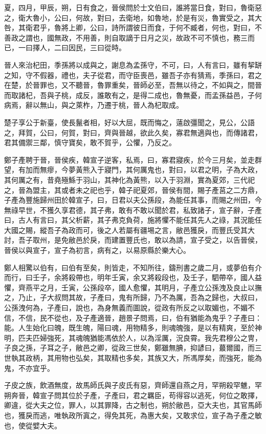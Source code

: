 \begin{pinyinscope}
夏，四月，甲辰，朔，日有食之，晉侯問於士文伯曰，誰將當日食，對曰，魯衛惡之，衛大魯小，公曰，何故，對曰，去衛地，如魯地，於是有災，魯實受之，其大咎，其衛君乎，魯將上卿，公曰，詩所謂彼日而食，于何不臧者，何也，對曰，不善政之謂也，國無政，不用善，則自取謫于日月之災，故政不可不慎也，務三而已，一曰擇人，二曰因民，三曰從時。

晉人來治杞田，季孫將以成與之，謝息為孟孫守，不可，曰，人有言曰，雖有挈缾之知，守不假器，禮也，夫子從君，而守臣喪邑，雖吾子亦有猜焉，季孫曰，君之在楚，於晉罪也，又不聽晉，魯罪重矣，晉師必至，吾無以待之，不如與之，間晉而取諸杞，吾與子桃，成反，誰敢有之，是得二成也，魯無憂，而孟孫益邑，子何病焉，辭以無山，與之萊柞，乃遷于桃，晉人為杞取成。

楚子享公于新臺，使長鬣者相，好以大屈，既而悔之，薳啟彊聞之，見公，公語之，拜賀，公曰，何賀，對曰，齊與晉越，欲此久矣，寡君無適與也，而傳諸君，君其備禦三鄰，慎守寶矣，敢不賀乎，公懼，乃反之。

鄭子產聘于晉，晉侯疾，韓宣子逆客，私焉，曰，寡君寢疾，於今三月矣，並走群望，有加而無瘳，今夢黃熊入于寢門，其何厲鬼也，對曰，以君之明，子為大政，其何厲之有，昔堯殛鯀于羽山，其神化為黃熊，以入于羽淵，實為夏郊，三代祀之，晉為盟主，其或者未之祀也乎，韓子祀夏郊，晉侯有間，賜子產莒之二方鼎，子產為豐施歸州田於韓宣子，曰，日君以夫公孫段，為能任其事，而賜之州田，今無祿早世，不獲久享君德，其子弗，敢有不敢以聞於君，私致諸子，宣子辭，子產曰，古人有言曰，其父析薪，其子弗克負荷，施將懼不能任其先人之祿，其況能任大國之賜，縱吾子為政而可，後之人若屬有疆埸之言，敝邑獲戾，而豐氏受其大討，吾子取州，是免敝邑於戾，而建置豐氏也，敢以為請，宣子受之，以告晉侯，晉侯以與宣子，宣子為初言，病有之，以易原縣於樂大心。

鄭人相驚以伯有，曰伯有至矣，則皆走，不知所往，鑄刑書之歲二月，或夢伯有介而行，曰壬子，余將殺帶也，明年壬寅，余又將殺段也，及壬子，駟帶卒，國人益懼，齊燕平之月，壬寅，公孫段卒，國人愈懼，其明月，子產立公孫洩及良止以撫之，乃止，子大叔問其故，子產曰，鬼有所歸，乃不為厲，吾為之歸也，大叔曰，公孫洩何為，子產曰，說也，為身無義而圖說，從政有所反之以取媚也，不媚不信，不信，民不從也，及子產適晉，趙景子問焉，曰，伯有猶能為鬼乎？子產曰：能。人生始化曰魄，既生魄，陽曰魂，用物精多，則魂魄強，是以有精爽，至於神明，匹夫匹婦強死，其魂魄猶能馮依於人，以為淫厲，況良霄。我先君穆公之冑，子良之孫，子耳之子，敝邑之卿，從政三世矣，鄭雖無腆，抑諺曰，蕞爾國，而三世執其政柄，其用物也弘矣，其取精也多矣，其族又大，所馮厚矣，而強死，能為鬼，不亦宜乎。

子皮之族，飲酒無度，故馬師氏與子皮氏有惡，齊師還自燕之月，罕朔殺罕魋，罕朔奔晉，韓宣子問其位於子產，子產曰，君之羈臣，苟得容以逃死，何位之敢擇，卿違，從大夫之位，罪人，以其罪降，古之制也，朔於敝邑，亞大夫也，其官馬師也，獲戾而逃，唯執政所寘之，得免其死，為惠大矣，又敢求位，宣子為子產之敏也，使從嬖大夫。


\end{pinyinscope}
